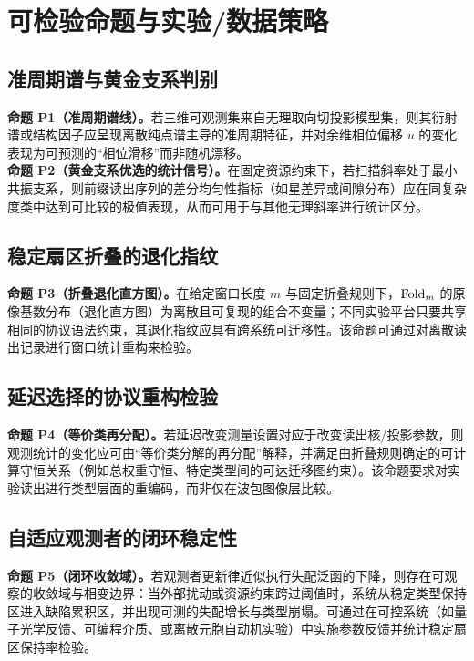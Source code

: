 \section{可检验命题与实验/数据策略}

\subsection{准周期谱与黄金支系判别}

\textbf{命题 P1（准周期谱线）。}若三维可观测集来自无理取向切投影模型集，则其衍射谱或结构因子应呈现离散纯点谱主导的准周期特征，并对余维相位偏移 $u$ 的变化表现为可预测的“相位滑移”而非随机漂移。\\
\textbf{命题 P2（黄金支系优选的统计信号）。}在固定资源约束下，若扫描斜率处于最小共振支系，则前缀读出序列的差分均匀性指标（如星差异或间隙分布）应在同复杂度类中达到可比较的极值表现，从而可用于与其他无理斜率进行统计区分。

\subsection{稳定扇区折叠的退化指纹}

\textbf{命题 P3（折叠退化直方图）。}在给定窗口长度 $m$ 与固定折叠规则下，$\mathrm{Fold}_m$ 的原像基数分布（退化直方图）为离散且可复现的组合不变量；不同实验平台只要共享相同的协议语法约束，其退化指纹应具有跨系统可迁移性。该命题可通过对离散读出记录进行窗口统计重构来检验。

\subsection{延迟选择的协议重构检验}

\textbf{命题 P4（等价类再分配）。}若延迟改变测量设置对应于改变读出核/投影参数，则观测统计的变化应可由“等价类分解的再分配”解释，并满足由折叠规则确定的可计算守恒关系（例如总权重守恒、特定类型间的可达迁移图约束）。该命题要求对实验读出进行类型层面的重编码，而非仅在波包图像层比较。

\subsection{自适应观测者的闭环稳定性}

\textbf{命题 P5（闭环收敛域）。}若观测者更新律近似执行失配泛函的下降，则存在可观察的收敛域与相变边界：当外部扰动或资源约束跨过阈值时，系统从稳定类型保持区进入缺陷累积区，并出现可测的失配增长与类型崩塌。可通过在可控系统（如量子光学反馈、可编程介质、或离散元胞自动机实验）中实施参数反馈并统计稳定扇区保持率检验。

